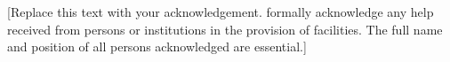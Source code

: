 
[Replace this text with your acknowledgement. formally acknowledge any help received from persons or institutions in the provision of facilities. The full name and position of all persons acknowledged are essential.]

\endinput